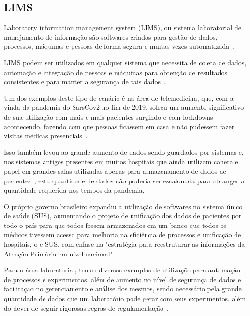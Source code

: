 \subsection{LIMS}


Laboratory information management system (LIMS), ou sistema laboratorial de manejamento de informação são softwares criados para gestão de dados, processos, máquinas e pessoas de forma segura e muitas vezes automatizada~\cite{Stafford1998LIMS:Technology}.


LIMS podem ser utilizados em qualquer sistema que necessita de coleta de dados, automação e integração de pessoas e máquinas para obtenção de resultados consistentes e para manter a segurança de tais dados~\cite{Sun2021LaboratoryEfficiency, TowardsXplore}.

Um dos exemplos deste tipo de cenário é na área de telemedicina, que, com a vinda da pandemia do SarsCov2 no fim de 2019, sofreu um aumento significativo de sua utilização com mais e mais pacientes surgindo e com lockdowns acontecendo, fazendo com que pessoas ficassem em casa e não pudessem fazer visitas médicas presenciais~\cite{kronenfeld2021, bakhtiar2020, GatesB.Colbert2020UtilityEra}.

Isso também levou ao grande aumento de dados sendo guardados por sistemas e, nos sistemas antigos presentes em muitos hospitais que ainda utilizam caneta e papel em grandes salas utilizadas apenas para armazenamento de dados de pacientes~\cite{2021TacklingMachine}, esta quantidade de dados não poderia ser escalonada para abranger a quantidade requerida nos tempos da pandemia.


O próprio governo brasileiro expandiu a utilização de softwares no sistema único de saúde (SUS), aumentando o projeto de unificação dos dados de pacientes por todo o país para que todos fossem armazenados em um banco que todos os médicos tivessem acesso para melhoria na eficiência de processos e unificação de hospitais, o  e-SUS, com enfase na "estratégia para reestruturar as informações da Atenção Primária em nível nacional"~\cite{Araujo2021DesafiosCovid-19}.

Para a área laboratorial, temos diversos exemplos de utilização para automação de processos e experimentos, além de aumento no nível de segurança de dados e facilitação no gerenciamento e análise dos mesmos, sendo necessário pela grande quantidade de dados que um laboratório pode gerar com seus experimentos, além do dever de seguir rigorosas regras de regulamentação~\cite{Holzmuller-Laue2014ImprovedAutomation, Holzmuller-Laue2013Model-drivenLaboratories}.

